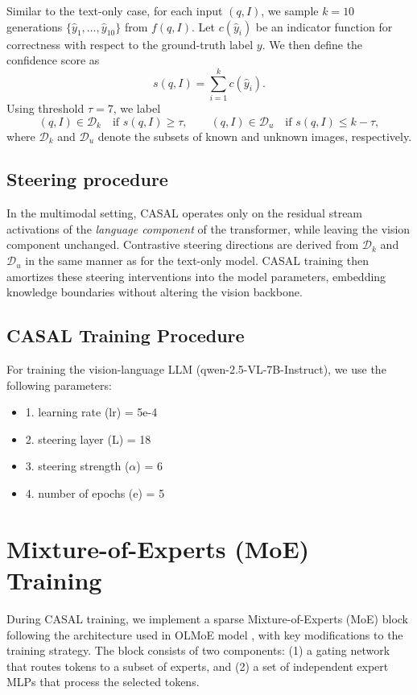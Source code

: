 \documentclass{article} %
\newcommand{\known}[1]{\textcolor{KnownGreen}{#1}}
\newcommand{\unknown}[1]{\textcolor{UnknownRed}{#1}}
\begin{document}
Similar to the text-only case, for each input $(q,I)$, we sample $k=10$ generations $\{ \hat{y}_1, \dots, \hat{y}_{10} \}$ from $f(q,I)$. Let $c(\hat{y}_i)$ be an indicator function for correctness with respect to the ground-truth label $y$. We then define the confidence score as  
\[
s(q,I) = \sum_{i=1}^{k} c(\hat{y}_i).
\]  
Using threshold $\tau=7$, we label  
\[
(q,I) \in \mathcal{D}_k \quad \text{if } s(q,I) \geq \tau, 
\qquad 
(q,I) \in \mathcal{D}_u \quad \text{if } s(q,I) \leq k - \tau,
\]  
where $\mathcal{D}_k$ and $\mathcal{D}_u$ denote the subsets of \known{known} and \unknown{unknown} images, respectively.

\subsection{Steering procedure}  
In the multimodal setting, CASAL operates only on the residual stream activations of the \emph{language component} of the transformer, while leaving the vision component unchanged. Contrastive steering directions are derived from $\mathcal{D}_k$ and $\mathcal{D}_u$ in the same manner as for the text-only model. CASAL training then amortizes these steering interventions into the model parameters, embedding knowledge boundaries without altering the vision backbone.

\subsection{CASAL Training Procedure}

For training the vision-language LLM (qwen-2.5-VL-7B-Instruct), we use the following parameters:

\begin{itemize}
\item 1. learning rate (lr) = 5e-4
\item 2. steering layer (L) = 18
\item 3. steering strength ($\alpha$) = 6
\item 4. number of epochs (e) = 5
\end{itemize}

\section{Mixture-of-Experts (MoE) Training}
\label{app:moe}

During CASAL training, we implement a sparse Mixture-of-Experts (MoE) block following the architecture used in OLMoE model \citep{muennighoff2025olmoeopenmixtureofexpertslanguage}, with key modifications to the training strategy. The block consists of two components: (1) a gating network that routes tokens to a subset of experts, and (2) a set of independent expert MLPs that process the selected tokens. 
\end{document}
